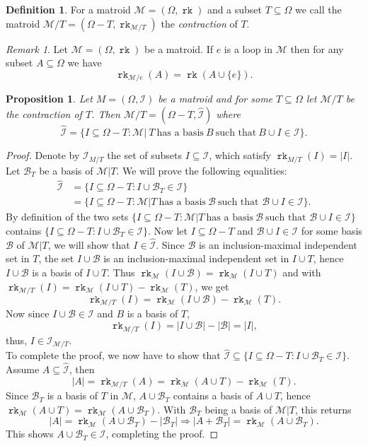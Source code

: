 \documentclass[12pt,a4paper, twoside, autooneside=false]{scrartcl}
\newtheorem{proposition}[theorem]{Proposition}
\theoremstyle{definition}
\newtheorem{definition}[theorem]{Definition}
\theoremstyle{remark}
\newtheorem{remark}[theorem]{Remark}
\numberwithin{equation}{section}
\DeclareMathOperator{\rk}{\mathtt{rk}}
\newcommand{\M}{\mathcal{M}} %
\begin{document}
\begin{definition}
For a matroid $\M = (\Omega, \rk)$ and a subset $T \subseteq \Omega$ we call the matroid $\M / T = (\Omega - T, \rk_{\M / T})$ the \textit{contraction} of $T$.   
\end{definition}
\begin{remark}
Let $\M = (\Omega, \rk)$ be a matroid. If $e$ is a loop in $\M$ then for any subset $A \subseteq \Omega$ we have
\[
\rk_{\M / e}(A) = \rk(A \cup \{e\}).
\]
\end{remark}
\begin{proposition}
Let $M = (\Omega, \mathcal{I})$ be a matroid and for some $T \subseteq \Omega$ let $\M / T$ be the contraction of $T$. Then $\M / T = (\Omega - T, \hat{\mathcal{I}})$ where 
\[
\hat{\mathcal{I}} = \{ I \subseteq \Omega - T : \M | \ T \ \text{has a basis} \ B \ \text{such that} \ B \cup I \in \mathcal{I}\}.
\]
\end{proposition}
\begin{proof}
Denote by $\mathcal{I}_{M / T}$ the set of subsets $I \subseteq \mathcal{I}$, which satisfy $\rk_{M/T}(I) = |I|$. Let $\mathcal{B}_T$ be a basis of $\M|T$. We will prove the following equalities:
\begin{align*}
\hat{\mathcal{I}} &= \{ I \subseteq \Omega - T: I \cup \mathcal{B}_T \in \mathcal{I}\} \\
&= \{I \subseteq \Omega - T: \M|T \ \text{has a basis} \ \mathcal{B} \ \text{such that } \mathcal{B} \cup I \in \mathcal{I}\}.
\end{align*}
By definition of the two sets $\{I \subseteq \Omega - T: \M|T \ \text{has a basis} \ \mathcal{B} \ \text{such that } \mathcal{B} \cup I \in \mathcal{I}\}$ contains $\{ I \subseteq \Omega - T: I \cup \mathcal{B}_T \in \mathcal{I}\}$. Now let $I \subseteq \Omega - T$ and $\mathcal{B} \cup I \in \mathcal{I}$ for some basis $\mathcal{B}$ of $\M|T$, we will show that $I \in \hat{\mathcal{I}}$. Since $\mathcal{B}$ is an inclusion-maximal independent set in $T$, the set $I \cup \mathcal{B}$ is an inclusion-maximal independent set in $I \cup T$, hence $I \cup \mathcal{B}$ is a basis of $I \cup T$. Thus $\rk_\M (I \cup \mathcal{B}) = \rk_\M (I \cup T)$ and with $\rk_{\M / T}(I) = \rk_{\M}( I \cup T) - \rk_{\M}(T)$, we get 
\[
\rk_{\M / T}(I) = \rk_{\M}(I \cup \mathcal{B}) - \rk_{\M}(T).
\]
Now since $I \cup \mathcal{B} \in \mathcal{I}$ and $B$ is a basis of $T$, 
\[
\rk_{\M /T}(I) = |I \cup \mathcal{B}| - |\mathcal{B}| = |I|, 
\]
thus, $I \in \mathcal{I}_{\M / T}$. \\ 
\indent To complete the proof, we now have to show that $\hat{\mathcal{I}} \subseteq \{ I \subseteq \Omega - T: I \cup \mathcal{B}_T \in \mathcal{I}\}$. Assume $A \subseteq \hat{\mathcal{I}}$, then 
\[
|A| = \rk_{\M / T}(A) = \rk_{\M}(A \cup T) - \rk_{\M}(T).
\]
Since $\mathcal{B}_T$ is a basis of $T$ in $\M$, $A \cup \mathcal{B}_T$ contains a basis of $A \cup T$, hence $\rk_\M (A \cup T) = \rk_\M (A \cup \mathcal{B}_T)$. With $\mathcal{B}_T$ being a basis of $\M|T$, this returns 
\[
|A| = \rk_{\M}(A \cup \mathcal{B}_T) - |\mathcal{B}_T| \Longrightarrow |A + \mathcal{B}_T| = \rk_{\M}(A \cup \mathcal{B}_T).
\] 
This shows $A \cup \mathcal{B}_T \in \mathcal{I}$, completing the proof.
\end{proof}
\end{document}
